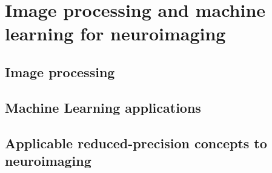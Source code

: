 \chapter{Image processing and machine learning for neuroimaging}
\begin{comment}
This section will discuss:
1. Image processing in neuroimaging
2. ML applications
3. Applicable RP concepts to neuroimaging

In the first 2 bullet point, talk in about the general field, then focus on the
main topic of interest.
Setup the context of the topic to justify the methods used.
\end{comment}

\section{Image processing}
\section{Machine Learning applications}
\section{Applicable reduced-precision concepts to neuroimaging}
